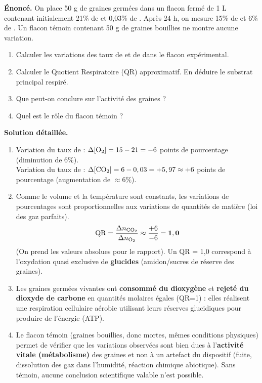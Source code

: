 \documentclass[11pt]{article}
\begin{document}
\begin{exoresolu}
\textbf{Énoncé.} On place 50 g de graines germées dans un flacon fermé de 1 L contenant initialement 21\% de  et 0,03\% de . Après 24 h, on mesure 15\% de  et 6\% de . Un flacon témoin contenant 50 g de graines bouillies ne montre aucune variation.
\begin{enumerate}
\item Calculer les variations des taux de  et de  dans le flacon expérimental.
\item Calculer le Quotient Respiratoire (QR) approximatif. En déduire le substrat principal respiré.
\item Que peut-on conclure sur l'activité des graines ?
\item Quel est le rôle du flacon témoin ?
\end{enumerate}
\tcblower
\textbf{Solution détaillée.}
\begin{enumerate}
\item Variation du taux de  : $\Delta[\ce{O2}] = 15 - 21 = -6$ points de pourcentage (diminution de $6\%$).\\
Variation du taux de  : $\Delta[\ce{CO2}] = 6 - 0,03 = +5,97 \approx +6$ points de pourcentage (augmentation de $\approx 6\%$).
\item Comme le volume et la température sont constants, les variations de pourcentages sont proportionnelles aux variations de quantités de matière (loi des gaz parfaits).
\[ \text{QR} = \frac{\Delta n_{\ce{CO2}}}{\Delta n_{\ce{O2}}} \approx \frac{+6}{-6} = \mathbf{1,0} \]
(On prend les valeurs absolues pour le rapport). Un QR = 1,0 correspond à l'oxydation quasi exclusive de \textbf{glucides} (amidon/sucres de réserve des graines).
\item Les graines germées vivantes ont \textbf{consommé du dioxygène} et \textbf{rejeté du dioxyde de carbone} en quantités molaires égales (QR=1) : elles réalisent une respiration cellulaire aérobie utilisant leurs réserves glucidiques pour produire de l'énergie (ATP).
\item Le flacon témoin (graines bouillies, donc mortes, mêmes conditions physiques) permet de vérifier que les variations observées sont bien dues à l'\textbf{activité vitale (métabolisme)} des graines et non à un artefact du dispositif (fuite, dissolution des gaz dans l'humidité, réaction chimique abiotique). Sans témoin, aucune conclusion scientifique valable n'est possible.
\end{enumerate}
\end{exoresolu}
\end{document}
